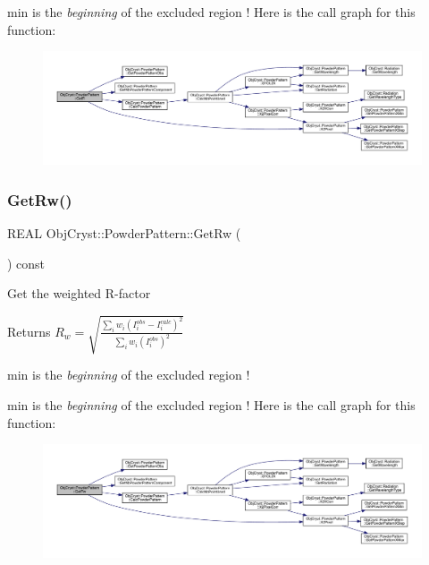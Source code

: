 min is the {\itshape beginning} of the excluded region ! Here is the call graph for this function\+:
\nopagebreak
\begin{figure}[H]
\begin{center}
\leavevmode
\includegraphics[width=350pt]{class_obj_cryst_1_1_powder_pattern_a2ab62a5d2d1de517a01252875dc905ab_cgraph}
\end{center}
\end{figure}
\mbox{\label{class_obj_cryst_1_1_powder_pattern_a6fce06a67de15dcba330517d461152f5}} 
\subsubsection{\texorpdfstring{GetRw()}{GetRw()}}
{\footnotesize\ttfamily R\+E\+AL Obj\+Cryst\+::\+Powder\+Pattern\+::\+Get\+Rw (\begin{DoxyParamCaption}{ }\end{DoxyParamCaption}) const}

Get the weighted R-\/factor \begin{DoxyReturn}{Returns}
$ R_{w}= \sqrt {\frac{\sum_i w_i\left( I_i^{obs}-I_i^{calc} \right)^2} {\sum_i w_i (I_i^{obs})^2} }$ 
\end{DoxyReturn}
min is the {\itshape beginning} of the excluded region !

min is the {\itshape beginning} of the excluded region ! Here is the call graph for this function\+:
\nopagebreak
\begin{figure}[H]
\begin{center}
\leavevmode
\includegraphics[width=350pt]{class_obj_cryst_1_1_powder_pattern_a6fce06a67de15dcba330517d461152f5_cgraph}
\end{center}
\end{figure}
\mbox{\label{class_obj_cryst_1_1_powder_pattern_a1c817b8e20b03b216323933e01e6fb00}} 
